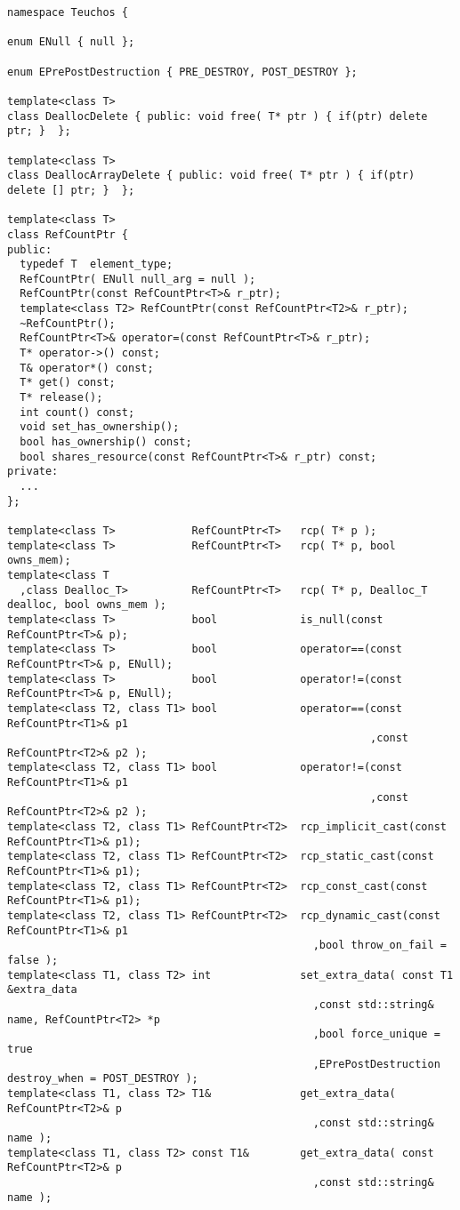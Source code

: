 \documentclass[pdf,ps2pdf,11pt]{SANDreport}
\begin{document}
{\scriptsize\begin{verbatim}
namespace Teuchos {

enum ENull { null };

enum EPrePostDestruction { PRE_DESTROY, POST_DESTROY };

template<class T>
class DeallocDelete { public: void free( T* ptr ) { if(ptr) delete ptr; }  };

template<class T>
class DeallocArrayDelete { public: void free( T* ptr ) { if(ptr) delete [] ptr; }  };

template<class T>
class RefCountPtr {
public:
  typedef T  element_type;
  RefCountPtr( ENull null_arg = null );
  RefCountPtr(const RefCountPtr<T>& r_ptr);
  template<class T2> RefCountPtr(const RefCountPtr<T2>& r_ptr);
  ~RefCountPtr();
  RefCountPtr<T>& operator=(const RefCountPtr<T>& r_ptr);
  T* operator->() const;
  T& operator*() const;
  T* get() const;
  T* release();
  int count() const;
  void set_has_ownership();
  bool has_ownership() const;
  bool shares_resource(const RefCountPtr<T>& r_ptr) const;
private:
  ...
};

template<class T>            RefCountPtr<T>   rcp( T* p );
template<class T>            RefCountPtr<T>   rcp( T* p, bool owns_mem);
template<class T
  ,class Dealloc_T>          RefCountPtr<T>   rcp( T* p, Dealloc_T dealloc, bool owns_mem );
template<class T>            bool             is_null(const RefCountPtr<T>& p);
template<class T>            bool             operator==(const RefCountPtr<T>& p, ENull);
template<class T>            bool             operator!=(const RefCountPtr<T>& p, ENull);
template<class T2, class T1> bool             operator==(const RefCountPtr<T1>& p1
                                                         ,const RefCountPtr<T2>& p2 );
template<class T2, class T1> bool             operator!=(const RefCountPtr<T1>& p1
                                                         ,const RefCountPtr<T2>& p2 );
template<class T2, class T1> RefCountPtr<T2>  rcp_implicit_cast(const RefCountPtr<T1>& p1);
template<class T2, class T1> RefCountPtr<T2>  rcp_static_cast(const RefCountPtr<T1>& p1);
template<class T2, class T1> RefCountPtr<T2>  rcp_const_cast(const RefCountPtr<T1>& p1);
template<class T2, class T1> RefCountPtr<T2>  rcp_dynamic_cast(const RefCountPtr<T1>& p1
                                                ,bool throw_on_fail = false );
template<class T1, class T2> int              set_extra_data( const T1 &extra_data
                                                ,const std::string& name, RefCountPtr<T2> *p
                                                ,bool force_unique = true
                                                ,EPrePostDestruction destroy_when = POST_DESTROY );
template<class T1, class T2> T1&              get_extra_data( RefCountPtr<T2>& p
                                                ,const std::string& name );
template<class T1, class T2> const T1&        get_extra_data( const RefCountPtr<T2>& p
                                                ,const std::string& name );
\end{verbatim}}
\end{document}
